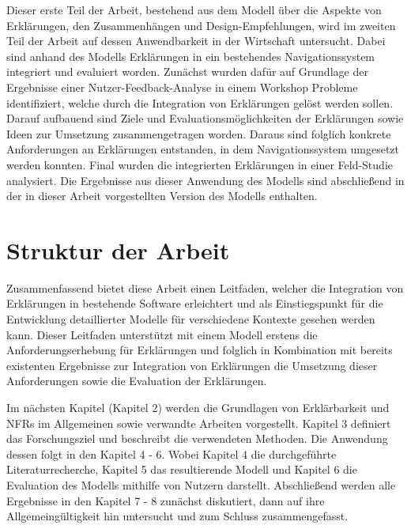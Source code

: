 Dieser erste Teil der Arbeit, bestehend aus dem Modell über die Aspekte von Erklärungen, den Zusammenhängen und Design-Empfehlungen, wird im zweiten Teil der Arbeit auf dessen Anwendbarkeit in der Wirtschaft untersucht. Dabei sind anhand des Modells Erklärungen in ein bestehendes Navigationssystem integriert und evaluiert worden. Zunächst wurden dafür auf Grundlage der Ergebnisse einer Nutzer-Feedback-Analyse in einem Workshop Probleme identifiziert, welche durch die Integration von Erklärungen gelöst werden sollen. Darauf aufbauend sind Ziele und Evaluationsmöglichkeiten der Erklärungen sowie Ideen zur Umsetzung zusammengetragen worden. Daraus sind folglich konkrete Anforderungen an Erklärungen entstanden, in dem Navigationssystem umgesetzt werden konnten. Final wurden die integrierten Erklärungen in einer Feld-Studie analysiert. Die Ergebnisse aus dieser Anwendung des Modells sind abschließend in der in dieser Arbeit vorgestellten Version des Modells enthalten.

\section{Struktur der Arbeit}

Zusammenfassend bietet diese Arbeit einen Leitfaden, welcher die Integration von Erklärungen in bestehende Software erleichtert und als Einstiegspunkt für die Entwicklung detaillierter Modelle für verschiedene Kontexte gesehen werden kann. Dieser Leitfaden unterstützt mit einem Modell erstens die Anforderungserhebung für Erklärungen und folglich in Kombination mit bereits existenten Ergebnisse zur Integration von Erklärungen die Umsetzung dieser Anforderungen sowie die Evaluation der Erklärungen.

Im nächsten Kapitel (Kapitel 2) werden die Grundlagen von Erklärbarkeit und NFRs im Allgemeinen sowie verwandte Arbeiten vorgestellt. Kapitel 3 definiert das Forschungsziel und beschreibt die verwendeten Methoden. Die Anwendung dessen folgt in den Kapitel 4 - 6. Wobei Kapitel 4 die durchgeführte Literaturrecherche, Kapitel 5 das resultierende Modell und Kapitel 6 die Evaluation des Modells mithilfe von Nutzern darstellt. Abschließend werden alle Ergebnisse in den Kapitel 7 - 8 zunächst diskutiert, dann auf ihre Allgemeingültigkeit hin untersucht und zum Schluss zusammengefasst.